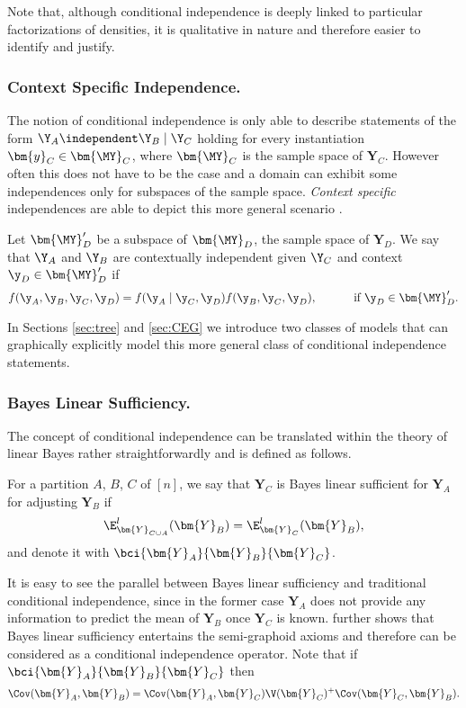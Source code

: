 Note that, although conditional independence is deeply linked to particular factorizations of densities, it is qualitative in nature and therefore easier to identify and justify.

\subsubsection{Context Specific Independence.}
The notion of conditional independence is only able to describe statements of the form $\Y_A\independent \Y_B \;|\;\Y_C $ holding for every instantiation $\bm{y}_C\in \bm{\MY}_C$, where $\bm{\MY}_C$ is the sample space of $\bm{Y}_C$. However often this does not have to be the case and a domain can exhibit some independences only for subspaces of the sample space. \textit{Context specific} independences are able to depict this more general scenario \citep{Boutilier1996}. 

\begin{definition}
Let $\bm{\MY}_D'$ be a subspace of $\bm{\MY}_D$, the sample space of $\bm{Y}_D$. We say that $\Y_A$ and $\Y_B$ are contextually independent given $\Y_C$ and context $\y_D\in\bm{\MY}_D'$ if
\begin{equation*}
f(\y_A,\y_B,\y_C,\y_D)=f(\y_A\;|\;\y_C,\y_D)f(\y_B,\y_C,\y_D), \hspace{1cm} \mbox{ if } \y_D\in\bm{\MY}_D'.
\end{equation*}
\end{definition} 

In Sections \ref{sec:tree} and \ref{sec:CEG} we introduce two classes of models that can graphically explicitly model this more general class of conditional independence statements. 
 
\subsubsection{Bayes Linear Sufficiency.} 
\label{sec:bayessuff}
The concept of conditional independence can be translated within the theory of linear Bayes rather straightforwardly and is defined as follows.
\begin{definition}
For a partition $A$, $B$, $C$ of $[n]$, we say that $\bm{Y}_C$ is Bayes linear sufficient for $\bm{Y}_A$ for adjusting $\bm{Y}_B$ if 
\begin{equation}
\E_{\bm{Y}_{C\cup A}}^l(\bm{Y}_B)=\E_{\bm{Y}_C}^l(\bm{Y}_B),
\end{equation}
and denote it with $\bci{\bm{Y}_A}{\bm{Y}_B}{\bm{Y}_C}$.
\end{definition}
It is easy to see the parallel between Bayes linear sufficiency and traditional conditional independence, since in the former case $\bm{Y}_A$ does not provide any information to predict the mean of $\bm{Y}_B$ once $\bm{Y}_C$ is known. \citet{Goldstein2007} further shows that Bayes linear sufficiency entertains the semi-graphoid axioms and therefore can be considered as a conditional independence operator. Note that if $\bci{\bm{Y}_A}{\bm{Y}_B}{\bm{Y}_C}$ then
\begin{equation}
\Cov(\bm{Y}_A,\bm{Y}_B)=\Cov(\bm{Y}_A,\bm{Y}_C)\V(\bm{Y}_C)^+\Cov(\bm{Y}_C,\bm{Y}_B).
\label{eq:covlin}
\end{equation}

